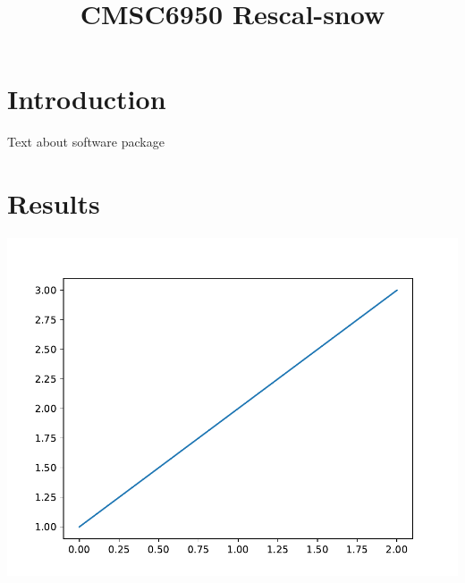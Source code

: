 \documentclass{article}
\title{CMSC6950 Rescal-snow}
\begin{document}
\maketitle

\section{Introduction}

Text about software package

\section{Results}

\includegraphics{snow_plot.pdf}
\end{document}
